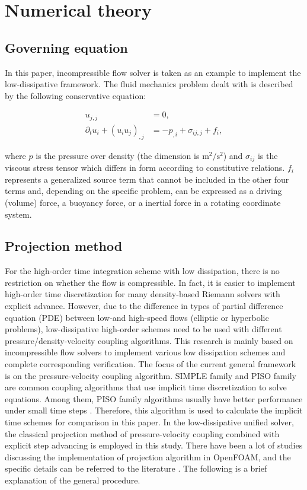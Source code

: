 \documentclass{article}
\begin{document}
\section{Numerical theory}
\label{sec:theory}

\subsection{Governing equation}

In this paper, incompressible flow solver is taken as an example to implement the low-dissipative framework. The fluid mechanics problem dealt with is described by the following conservative equation:

\begin{align}
  \label{eq:NS:continuity}
  u_{j,j} &= 0,  \\
  \label{eq:NS:momentum}
  \partial_t u_i + (u_i u_j)_{,j} &= -p_{,i} + \sigma_{ij,j} + f_i,
\end{align}

where $p$ is the pressure over density (the dimension is $\mathrm{m^2/s^2}$) and $\sigma_{ij}$ is the viscous stress tensor which differs in form according to constitutive relations. $f_i$ represents a generalized source term that cannot be included in the other four terms and, depending on the specific problem, can be expressed as a driving (volume) force, a buoyancy force, or a inertial force in a rotating coordinate system.


\subsection{Projection method}
\label{ssec:projection}

For the high-order time integration scheme with low dissipation, there is no restriction on whether the flow is compressible. In fact, it is easier to implement high-order time discretization for many density-based Riemann solvers with explicit advance. However, due to the difference in types of partial difference equation (PDE) between low-and high-speed flows (elliptic or hyperbolic problems), low-dissipative high-order schemes need to be used with different pressure/density-velocity coupling algorithms. This research is mainly based on incompressible flow solvers to implement various low dissipation schemes and complete corresponding verification. The focus of the current general framework is on the pressure-velocity coupling algorithm. SIMPLE family and PISO family are common coupling algorithms that use implicit time discretization to solve equations. Among them, PISO family algorithms usually have better performance under small time steps \citep{Issa:1986:1,Issa:1986:2}. Therefore, this algorithm is used to calculate the implicit time schemes for comparison in this paper. In the low-dissipative unified solver, the classical projection method of pressure-velocity coupling combined with explicit step advancing is employed in this study. There have been a lot of studies discussing the implementation of projection algorithm in OpenFOAM, and the specific details can be referred to the literature \citep{Vuorinen:2014}. The following is a brief explanation of the general procedure.
\end{document}
